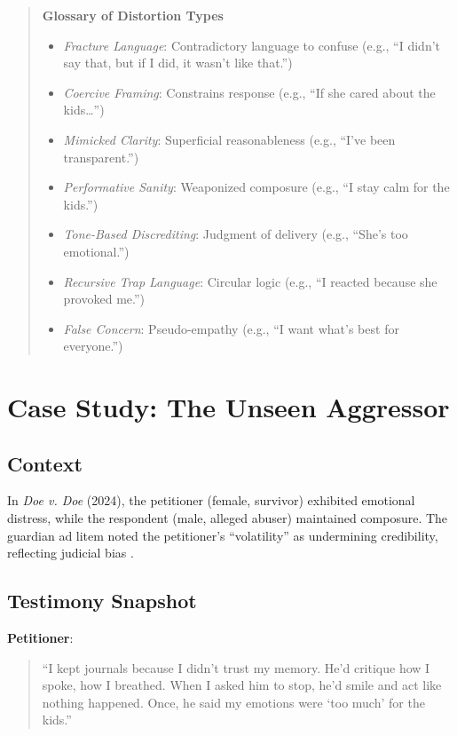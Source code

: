 \documentclass[11pt]{article}
\begin{document}
\begin{quote}
\textbf{Glossary of Distortion Types}
\begin{itemize}
    \item \textit{Fracture Language}: Contradictory language to confuse (e.g., ``I didn’t say that, but if I did, it wasn’t like that.'')
    \item \textit{Coercive Framing}: Constrains response (e.g., ``If she cared about the kids…'')
    \item \textit{Mimicked Clarity}: Superficial reasonableness (e.g., ``I’ve been transparent.'')
    \item \textit{Performative Sanity}: Weaponized composure (e.g., ``I stay calm for the kids.'')
    \item \textit{Tone-Based Discrediting}: Judgment of delivery (e.g., ``She’s too emotional.'')
    \item \textit{Recursive Trap Language}: Circular logic (e.g., ``I reacted because she provoked me.'')
    \item \textit{False Concern}: Pseudo-empathy (e.g., ``I want what’s best for everyone.'')
\end{itemize}
\end{quote}

\section{Case Study: The Unseen Aggressor}
\label{sec:casestudy}
\subsection{Context}
In \textit{Doe v. Doe} (2024), the petitioner (female, survivor) exhibited emotional distress, while the respondent (male, alleged abuser) maintained composure. The guardian ad litem noted the petitioner’s ``volatility'' as undermining credibility, reflecting judicial bias \citep{babcock2017}.

\subsection{Testimony Snapshot}
\textbf{Petitioner}:  
\begin{quote}
``I kept journals because I didn’t trust my memory. He’d critique how I spoke, how I breathed. When I asked him to stop, he’d smile and act like nothing happened. Once, he said my emotions were `too much' for the kids.''
\end{quote}
\end{document}
